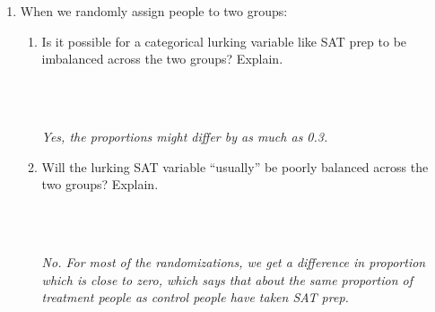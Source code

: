 \begin{enumerate}
\begin{enumerate}
\end{enumerate}

\item When we randomly assign people to two groups:
  \begin{enumerate}
  \item Is it possible for a categorical lurking variable like SAT prep
    to be imbalanced across the two groups?  Explain.
\begin{students}
    \vspace{1.5cm}\\
\end{students}
\begin{key}
  \\ {\it Yes, the proportions might differ by as much as 0.3.} 
\end{key}
  \item Will the lurking SAT variable ``usually'' be poorly balanced
    across the two groups?  Explain.
\begin{students}
        \vspace{1.5cm}\\
\end{students}
\begin{key}
  \\ {\it  No. For most of the randomizations, we get a difference in
    proportion which is close to zero, which says that about the same
    proportion of treatment people as control people have taken SAT prep. } 
\end{key}
  \end{enumerate}


\end{enumerate}
